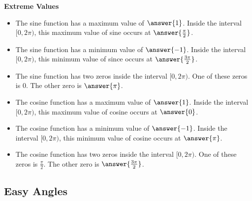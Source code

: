 \documentclass{ximera}
\begin{document}
\begin{explanation}   \textbf{\textcolor{red!75!green}{Extreme Values}} 
\begin{itemize}

  \item The sine function has a maximum value of $\answer{1}$.  Inside the interval $[0, 2\pi)$, this maximum value of sine occurs at $\answer{\frac{\pi}{2}}$.

  \item The sine function has a minimum value of $\answer{-1}$.  Inside the interval $[0, 2\pi)$, this minimum value of since occurs at $\answer{\frac{3\pi}{2}}$.

  \item The sine function has two zeros inside the interval $[0, 2\pi)$. One of these zeros is $0$.  The other zero is $\answer{\pi}$.


\end{itemize}





\begin{itemize}
  
  \item The cosine function has a maximum value of $\answer{1}$.  Inside the interval $[0, 2\pi)$, this maximum value of cosine occurs at $\answer{0}$.

  \item The cosine function has a minimum value of $\answer{-1}$.  Inside the interval $[0, 2\pi)$, this minimum value of cosine occurs at $\answer{\pi}$.

  \item The cosine function has two zeros inside the interval $[0, 2\pi)$. One of these zeros is $\frac{\pi}{2}$.  The other zero is $\answer{\frac{3\pi}{2}}$.


\end{itemize}

\end{explanation}
























\subsection*{Easy Angles}
\end{document}
